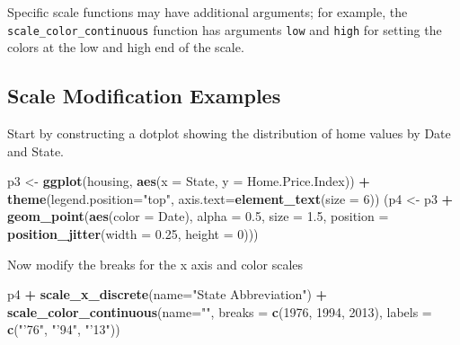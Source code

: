 \documentclass[]{book}
\newenvironment{Shaded}{\begin{snugshade}}{\end{snugshade}}
\newcommand{\KeywordTok}[1]{\textcolor[rgb]{0.13,0.29,0.53}{\textbf{#1}}}
\newcommand{\DataTypeTok}[1]{\textcolor[rgb]{0.13,0.29,0.53}{#1}}
\newcommand{\DecValTok}[1]{\textcolor[rgb]{0.00,0.00,0.81}{#1}}
\newcommand{\FloatTok}[1]{\textcolor[rgb]{0.00,0.00,0.81}{#1}}
\newcommand{\StringTok}[1]{\textcolor[rgb]{0.31,0.60,0.02}{#1}}
\newcommand{\OperatorTok}[1]{\textcolor[rgb]{0.81,0.36,0.00}{\textbf{#1}}}
\newcommand{\NormalTok}[1]{#1}
\begin{document}
Specific scale functions may have additional arguments; for example, the
\texttt{scale\_color\_continuous} function has arguments \texttt{low}
and \texttt{high} for setting the colors at the low and high end of the
scale.

\subsection{Scale Modification
Examples}\label{scale-modification-examples}

Start by constructing a dotplot showing the distribution of home values
by Date and State.

\begin{Shaded}
\begin{Highlighting}[]
\NormalTok{p3 <-}\StringTok{ }\KeywordTok{ggplot}\NormalTok{(housing,}
             \KeywordTok{aes}\NormalTok{(}\DataTypeTok{x =}\NormalTok{ State,}
                 \DataTypeTok{y =}\NormalTok{ Home.Price.Index)) }\OperatorTok{+}\StringTok{ }
\StringTok{        }\KeywordTok{theme}\NormalTok{(}\DataTypeTok{legend.position=}\StringTok{"top"}\NormalTok{,}
              \DataTypeTok{axis.text=}\KeywordTok{element_text}\NormalTok{(}\DataTypeTok{size =} \DecValTok{6}\NormalTok{))}
\NormalTok{(p4 <-}\StringTok{ }\NormalTok{p3 }\OperatorTok{+}\StringTok{ }\KeywordTok{geom_point}\NormalTok{(}\KeywordTok{aes}\NormalTok{(}\DataTypeTok{color =}\NormalTok{ Date),}
                       \DataTypeTok{alpha =} \FloatTok{0.5}\NormalTok{,}
                       \DataTypeTok{size =} \FloatTok{1.5}\NormalTok{,}
                       \DataTypeTok{position =} \KeywordTok{position_jitter}\NormalTok{(}\DataTypeTok{width =} \FloatTok{0.25}\NormalTok{, }\DataTypeTok{height =} \DecValTok{0}\NormalTok{)))}
\end{Highlighting}
\end{Shaded}

Now modify the breaks for the x axis and color scales

\begin{Shaded}
\begin{Highlighting}[]
\NormalTok{p4 }\OperatorTok{+}\StringTok{ }\KeywordTok{scale_x_discrete}\NormalTok{(}\DataTypeTok{name=}\StringTok{"State Abbreviation"}\NormalTok{) }\OperatorTok{+}
\StringTok{  }\KeywordTok{scale_color_continuous}\NormalTok{(}\DataTypeTok{name=}\StringTok{""}\NormalTok{,}
                         \DataTypeTok{breaks =} \KeywordTok{c}\NormalTok{(}\DecValTok{1976}\NormalTok{, }\DecValTok{1994}\NormalTok{, }\DecValTok{2013}\NormalTok{),}
                         \DataTypeTok{labels =} \KeywordTok{c}\NormalTok{(}\StringTok{"'76"}\NormalTok{, }\StringTok{"'94"}\NormalTok{, }\StringTok{"'13"}\NormalTok{))}
\end{Highlighting}
\end{Shaded}
\end{document}
